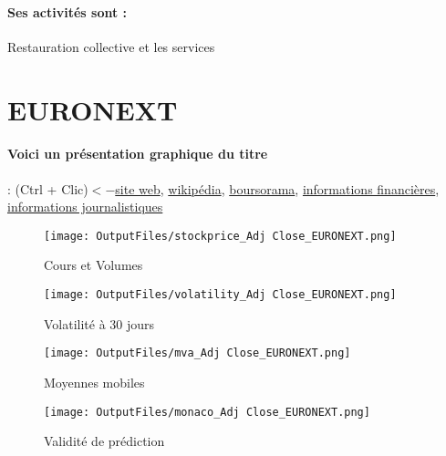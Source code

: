 \documentclass[11pt,a4paper]{report}%
\begin{document}
\paragraph{Ses activités sont : } Restauration collective et les services 
    
    \newpage

\section{EURONEXT}

\paragraph{Voici un présentation graphique du titre} : (Ctrl + Clic)$<-$\href{https://www.euronext.com/fr/investor-relations}{site web}, \href{https://fr.wikipedia.org/wiki/Euronext}{wikipédia}, \href{https://www.boursorama.com/cours/1rPENX}{boursorama}, \href{https://www.qwant.com/?q=site:https:%2f%2fwww.easybourse.com%2faction-societe%2fEURONEXT&t=web&client=ext-firefox-hp}{informations financières}, \href{https://bourse.lerevenu.com/cours-de-bourse/fiche-valeur-synthese/EURONEXT/ENX-FR}{informations journalistiques}
\begin{figure}[!htb]
   \begin{minipage}{0.5\textwidth}
     \centering
     \texttt{[image: OutputFiles/stockprice\_Adj Close\_EURONEXT.png]}
     \caption{Cours et Volumes}\label{Fig:price_EURONEXT}
   \end{minipage}\hfill
   \begin{minipage}{0.5\textwidth}
     \centering
     \texttt{[image: OutputFiles/volatility\_Adj Close\_EURONEXT.png]}
     \caption{Volatilité à 30 jours}\label{Fig:volat_EURONEXT}
   \end{minipage}
\end{figure}
\begin{figure}[!htb]
   \begin{minipage}{0.5\textwidth}
     \centering
     \texttt{[image: OutputFiles/mva\_Adj Close\_EURONEXT.png]}
     \caption{Moyennes mobiles}\label{Fig:mva_EURONEXT}
   \end{minipage}\hfill
   \begin{minipage}{0.5\textwidth}
     \centering
     \texttt{[image: OutputFiles/monaco\_Adj Close\_EURONEXT.png]}
     \caption{Validité de prédiction}\label{Fig:prediction_EURONEXT}
   \end{minipage}
\end{figure}
\end{document}
